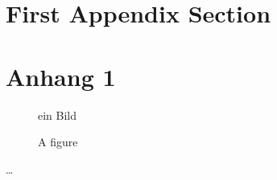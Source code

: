 

\appendix

{}	%
{}	%


{\section{First Appendix Section}
		\label{Anhang-Implementierung}}
{\section{Anhang 1}
		\label{Anhang-Implementierung}}
		
\setcounter{figure}{0}
		
\begin{figure} [ht]
  \centering
   ein Bild
  \caption{A figure}
  \label{fig:BPMNBeispiela}
\end{figure}


\dots



